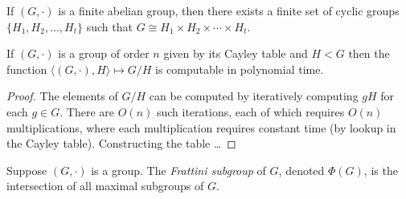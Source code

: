 \documentclass{article}
\begin{document}
\begin{lemma}\label{lem:decompose}
  If $(G, \cdot)$ is a finite abelian group, then there exists a finite set of cyclic groups $\{H_1, H_2, \dotsc, H_t\}$ such that $G \cong H_1 \times H_2 \times \dotsb \times H_t$.
\end{lemma}

\begin{lemma}\label{lem:factorgroup}
  If $(G, \cdot)$ is a group of order $n$ given by its Cayley table and $H < G$ then the function $\langle (G, \cdot), H \rangle \mapsto G / H$ is computable in polynomial time.
\end{lemma}
\begin{proof}
  The elements of $G / H$ can be computed by iteratively computing $g H$ for each $g \in G$.
  There are $O(n)$ such iterations, each of which requires $O(n)$ multiplications, where each multiplication requires constant time (by lookup in the Cayley table).
  Constructing the table \ldots
\end{proof}

\begin{definition}
  Suppose $(G, \cdot)$ is a group.
  The \emph{Frattini subgroup} of $G$, denoted $\Phi(G)$, is the intersection of all maximal subgroups of $G$.
\end{definition}
\end{document}
